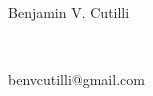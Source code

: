 %
% 
%







%

\setlength{\tabcolsep}{0.1in}

\begin{center}
    \begin{LARGE}
        Benjamin V. Cutilli
    \end{LARGE} \\
    \begin{large}
        benvcutilli@gmail.com \\
    \end{large}
\end{center} \vspace{0.5in}








